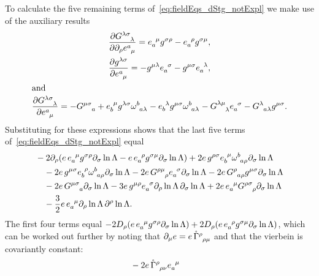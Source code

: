 \documentclass[
final,
11pt,
a4paper,
DIV=11,
headinclude=true,
footinclude=false,
bibliography=totoc,
twoside=true,  %
BCOR=5mm
]{scrbook}
\begin{document}
\begin{subappendices}
To calculate the five remaining terms 
of~\eqref{eq:fieldEqs_dStg_notExpl} we make use of the auxiliary 
results
\begin{gather*}
  \frac{\pd G\ind{^{\lambda\sigma}_\lambda}}{\pd \pd_\rho e\ind{^a_\mu}}
  = e\ind{_a^\mu} g^{\sigma\rho} - e\ind{_a^\rho} g^{\sigma\mu},
  \\
  \frac{\pd g^{\lambda\sigma}}{\pd e\ind{^a_\mu}} = -g^{\mu\lambda} 
  e\ind{_a^\sigma} - g^{\mu\sigma} e\ind{_a^\lambda},
  \\
  \shortintertext{and}
  \frac{\pd G\ind{^{\lambda\sigma}_\lambda}}{\pd e\ind{^a_\mu}} =
  -G\ind{^{\mu\sigma}_a} + e\ind{_b^\mu} g^{\lambda\sigma} 
  \omega\ind{^b_{a\lambda}} - e\ind{_b^\lambda} g^{\mu\sigma} 
  \omega\ind{^b_{a\lambda}} - G\ind{^{\lambda\mu}_\lambda} 
  e\ind{_a^\sigma} - G\ind{^\lambda_{a\lambda}} g^{\mu\sigma}.
\end{gather*}
Substituting for these expressions shows that the last five terms 
of~\eqref{eq:fieldEqs_dStg_notExpl} equal
\begin{align}
  &-2 \pd_\rho ( e\, e\ind{_a^\mu} g^{\sigma\rho} \pd_\sigma 
  \ln\Lambda - e\, e\ind{_a^\rho} g^{\sigma\mu} \pd_\sigma 
  \ln\Lambda ) + 2e\, g^{\rho\sigma} e\ind{_b^\mu} 
  \omega\ind{^b_{a\rho}} \pd_\sigma \ln\Lambda
  \notag
  \\
  &\hspace{1em}
  -2e\, g^{\mu\sigma} e\ind{_b^\rho} \omega\ind{^b_{a\rho}} 
  \pd_\sigma \ln\Lambda - 2e\, G\ind{^{\rho\mu}_\rho} 
  e\ind{_a^\sigma} \pd_\sigma \ln\Lambda - 2e\, G\ind{^\rho    
    _{a\rho}} g^{\mu\sigma} \pd_\sigma \ln\Lambda
  \notag
  \\
  &\hspace{1em}
  -2e\, G\ind{^{\mu\sigma}_a} \pd_\sigma \ln\Lambda - 3e\, 
  g^{\mu\rho} e\ind{_a^\sigma} \pd_\rho \ln\Lambda\, \pd_\sigma 
  \ln\Lambda + 2e\, e\ind{_a^\mu} G\ind{^{\rho\sigma}_\rho} 
  \pd_\sigma \ln\Lambda
  \notag
  \\
  &\hspace{1em}
  - \frac{3}{2} e\, e\ind{_a^\mu} \pd_\rho \ln\Lambda\, 
  \pd^\rho \ln\Lambda.
  \label{eq:feqs_dStg_subres2}
\end{align}
The first four terms equal $-2 D_\rho(e\, e\ind{_a^\mu} 
g^{\sigma\rho} \pd_\sigma \ln\Lambda) + 2 D_\rho(e\, e\ind{_a^\rho} 
g^{\sigma\mu} \pd_\sigma \ln\Lambda)$, which can be worked out 
further by noting that $\pd_\mu e = e\, 
\mring{\Gamma}\ind{^\rho_{\rho\mu}}$ and that the vierbein is 
covariantly constant:
\begin{align*}
  &-2e\, \mring{\Gamma}\ind{^\rho_{\rho\nu}} e\ind{_a^\mu} 

\end{align*}
\end{subappendices}
\end{document}
